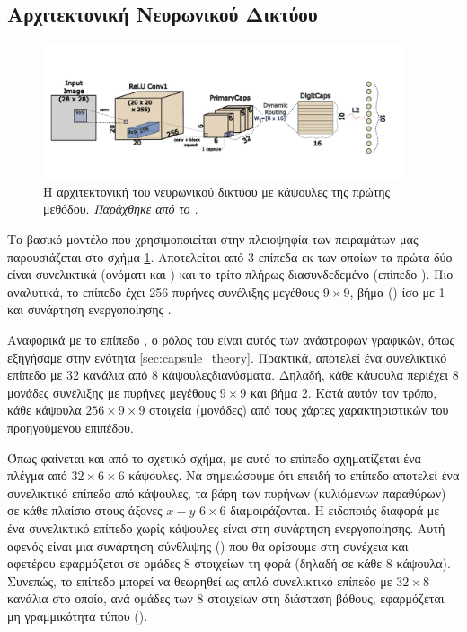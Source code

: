 \subsection{Αρχιτεκτονική Νευρωνικού Δικτύου}

\begin{figure}[h]
    \centering
    \includegraphics[width=0.95\textwidth]{images/chapter method/first_method_architecture_encoder.pdf}
    \caption{Η αρχιτεκτονική του νευρωνικού δικτύου με κάψουλες της πρώτης μεθόδου. \textit{Παράχθηκε από το \href{https://inkscape.org/}{}}.}
    \label{fig:method_1_architecture}
  \end{figure}

Το βασικό μοντέλο που χρησιμοποιείται στην πλειοψηφία των πειραμάτων μας παρουσιάζεται στο σχήμα \ref{fig:method_1_architecture}. Αποτελείται από 3 επίπεδα εκ των οποίων τα πρώτα δύο είναι συνελικτικά (ονόματι  και ) και το τρίτο πλήρως διασυνδεδεμένο (επίπεδο ). Πιο αναλυτικά, το επίπεδο  έχει 256 πυρήνες συνέλιξης μεγέθους $9 \times 9$, βήμα () ίσο με 1 και συνάρτηση ενεργοποίησης .\par

Αναφορικά με το επίπεδο , ο ρόλος του είναι αυτός των ανάστροφων γραφικών, όπως εξηγήσαμε στην ενότητα \ref{sec:capsule_theory}. Πρακτικά, αποτελεί ένα συνελικτικό επίπεδο με 32 κανάλια από 8 κάψουλες\textendash διανύσματα. Δηλαδή, κάθε κάψουλα περιέχει 8 μονάδες συνέλιξης με πυρήνες μεγέθους $9 \times 9$ και βήμα 2. Κατά αυτόν τον τρόπο, κάθε κάψουλα  $256 \times 9 \times 9$ στοιχεία (μονάδες) από τους χάρτες χαρακτηριστικών του προηγούμενου επιπέδου.\par

Όπως φαίνεται και από το σχετικό σχήμα, με αυτό το επίπεδο σχηματίζεται ένα πλέγμα από $32 \times 6 \times 6$ κάψουλες. Να σημειώσουμε ότι επειδή το επίπεδο  αποτελεί ένα συνελικτικό επίπεδο από κάψουλες, τα βάρη των πυρήνων (κυλιόμενων παραθύρων) σε κάθε πλαίσιο στους άξονες $x-y$ $6 \times 6$ διαμοιράζονται. Η ειδοποιός διαφορά με ένα συνελικτικό επίπεδο χωρίς κάψουλες είναι στη συνάρτηση ενεργοποίησης. Αυτή αφενός είναι μια συνάρτηση σύνθλιψης () που θα ορίσουμε στη συνέχεια και αφετέρου εφαρμόζεται σε ομάδες 8 στοιχείων τη φορά (δηλαδή σε κάθε 8 κάψουλα). Συνεπώς, το επίπεδο  μπορεί να θεωρηθεί ως απλό συνελικτικό επίπεδο με $32 \times 8$ κανάλια στο οποίο, ανά ομάδες των 8 στοιχείων στη διάσταση βάθους, εφαρμόζεται μη γραμμικότητα τύπου  ().\par

